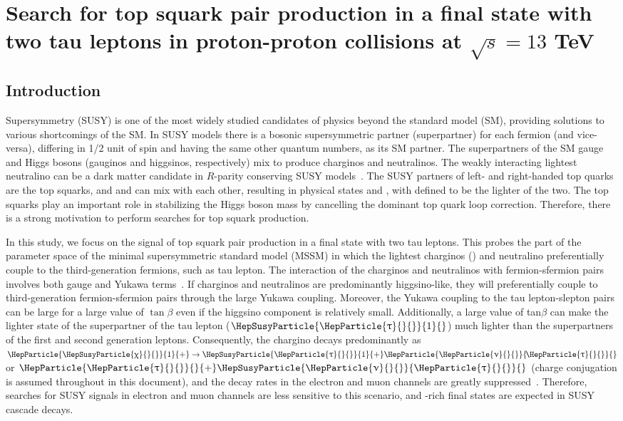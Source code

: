\documentclass[12pt, a4paper]{article}
\DeclareRobustCommand{\PQt}{\HepParticle{t}{}{}} %
\DeclareRobustCommand{\PGt}{{\HepParticle{\uptau}{}{}}\xspace} %
\DeclareRobustCommand{\PGtp}{{\HepParticle{\PGt}{}{+}}\xspace} %
\DeclareRobustCommand{\PGn}{{\HepParticle{\upnu}{}{}}\xspace} %
\DeclareRobustCommand{\PGnGt}{{\HepParticle{\PGn}{\!\PGt}{}}\xspace} %
\DeclareRobustCommand{\PSQtL}{{\HepSusyParticle{\PQt}{L}{}}\xspace}
\DeclareRobustCommand{\PSQtR}{{\HepSusyParticle{\PQt}{R}{}}\xspace}
\DeclareRobustCommand{\PSQtDo}{{\HepSusyParticle{\PQt}{1}{}}\xspace}
\DeclareRobustCommand{\PSQtDt}{{\HepSusyParticle{\PQt}{2}{}}\xspace}
\DeclareRobustCommand{\PSGtpDo}{{\HepSusyParticle{\PGt}{1}{+}}\xspace} %
\DeclareRobustCommand{\PSGtDo}{{\HepSusyParticle{\PGt}{1}{}}\xspace} %
\DeclareRobustCommand{\PSGnGt}{{\HepSusyParticle{\PGn}{{\PGt}}{}}\xspace} %
\DeclareRobustCommand{\PSGc}{{\HepSusyParticle{\upchi}{}{}}\xspace} %
\DeclareRobustCommand{\PSGczDo}{{\HepParticle{\PSGc}{1}{0}}\xspace}
\DeclareRobustCommand{\PSGcpDo}{{\HepParticle{\PSGc}{1}{+}}\xspace}
\DeclareRobustCommand{\PSGcpmDo}{{\HepParticle{\PSGc}{1}{\pm}}\xspace}
\begin{document}
\section{Search for top squark pair production in a final state with two tau leptons in proton-proton collisions at $\sqrt{s} = 13$ TeV}\label{stop_search}

\subsection{Introduction}\label{susy_intro}

Supersymmetry (SUSY) \cite{Ramond:1971gb, Golfand:1971iw, Neveu:1971rx, Wess:1973kz, Fayet:1974pd, tHooft:1979rat, Kaul:1981hi, Nilles:1983ge, Martin:1997ns} is one of the most widely studied candidates of physics beyond the standard model (SM), providing solutions to various shortcomings of the SM. In SUSY models there is a bosonic supersymmetric partner (superpartner) for each fermion (and vice-versa), differing in 1/2 unit of spin and having the same other quantum numbers, as its SM partner. The superpartners of the SM gauge and Higgs bosons (gauginos and higgsinos, respectively) mix to produce charginos and neutralinos. The weakly interacting lightest neutralino \PSGczDo can be a dark matter candidate in $R$-parity conserving SUSY models~\cite{Farrar:1978xj}. The SUSY partners of left- and right-handed top quarks are the top squarks, \PSQtL and \PSQtR and can mix with each other, resulting in physical states \PSQtDo and \PSQtDt, with \PSQtDo defined to be the lighter of the two. The top squarks play an important role in stabilizing the Higgs boson mass by cancelling the dominant top quark loop correction. Therefore, there is a strong motivation to perform searches for top squark production.

In this study, we focus on the signal of top squark pair production in a final state with two tau leptons. This probes the part of the parameter space of the minimal supersymmetric standard model (MSSM) in which the lightest charginos (\PSGcpmDo) and neutralino preferentially couple to the third-generation fermions, such as tau lepton. The interaction of the charginos and neutralinos with fermion-sfermion pairs involves both gauge and Yukawa terms~\cite{Martin:1997ns}. If charginos and neutralinos are predominantly higgsino-like, they will preferentially couple to third-generation fermion-sfermion pairs through the large Yukawa coupling. Moreover, the Yukawa coupling to the tau lepton-slepton pairs can be large for a large value of $\tan\beta$ even if the higgsino component is relatively small. Additionally, a large value of tan$\beta$ can make the lighter state of the superpartner of the tau lepton ($\PSGtDo$) much lighter than the superpartners of the first and second generation leptons. Consequently, the chargino decays predominantly as $ \PSGcpDo \to \PSGtpDo \PGnGt $ or $ \PGtp \PSGnGt $ (charge conjugation is assumed throughout in this document), and the decay rates in the electron and muon channels are greatly suppressed~\cite{Baer:1997yi, Guchait:2002xh}.
Therefore, searches for SUSY signals in electron and muon channels are less sensitive to this scenario, and \PGt-rich final states are expected in SUSY cascade decays.
\end{document}
